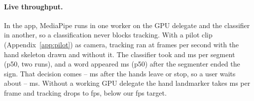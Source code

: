 \paragraph{Live throughput.}
In the app, MediaPipe runs in one worker on the GPU delegate and the classifier in another, so a
classification never blocks tracking. With a pilot clip (Appendix~\ref{app:pilot}) as camera,
tracking ran at
 frames per second with the hand skeleton drawn and  without it.
The classifier took  and  ms per segment (p50, two runs), and a
word appeared  ms (p50) after the segmenter ended the sign. That decision comes
-- ms after the hands leave or stop, so a user waits about
-- ms. Without a working GPU delegate the hand landmarker takes
 ms per frame and tracking drops to  fps, below our  fps
target.
